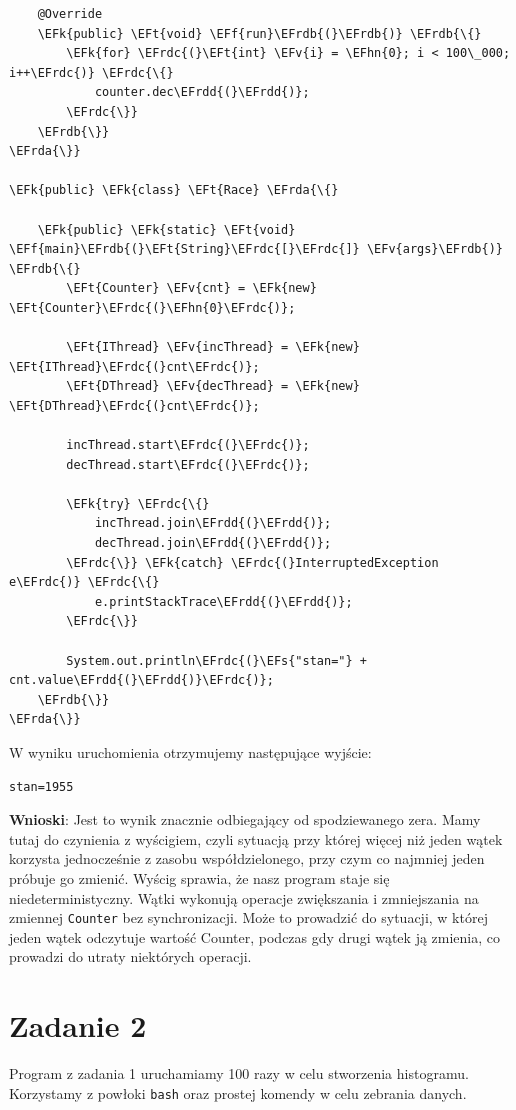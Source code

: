 \documentclass[11pt]{article}
\newcommand{\EFs}[1]{\textcolor{EFs}{#1}} %
\newcommand{\EFk}[1]{\textbf{#1}} %
\newcommand{\EFf}[1]{\textbf{#1}} %
\newcommand{\EFv}[1]{#1} %
\newcommand{\EFt}[1]{\textbf{#1}} %
\newcommand{\EFhn}[1]{\textcolor{EFhn}{\textbf{#1}}} %
\newcommand{\EFrda}[1]{\textcolor{EFrda}{#1}} %
\newcommand{\EFrdb}[1]{\textcolor{EFrdb}{#1}} %
\newcommand{\EFrdc}[1]{\textcolor{EFrdc}{#1}} %
\newcommand{\EFrdd}[1]{\textcolor{EFrdd}{#1}} %
\begin{document}
\begin{Code}
\begin{Verbatim}
    @Override
    \EFk{public} \EFt{void} \EFf{run}\EFrdb{(}\EFrdb{)} \EFrdb{\{}
        \EFk{for} \EFrdc{(}\EFt{int} \EFv{i} = \EFhn{0}; i < 100\_000; i++\EFrdc{)} \EFrdc{\{}
            counter.dec\EFrdd{(}\EFrdd{)};
        \EFrdc{\}}
    \EFrdb{\}}
\EFrda{\}}

\EFk{public} \EFk{class} \EFt{Race} \EFrda{\{}

    \EFk{public} \EFk{static} \EFt{void} \EFf{main}\EFrdb{(}\EFt{String}\EFrdc{[}\EFrdc{]} \EFv{args}\EFrdb{)} \EFrdb{\{}
        \EFt{Counter} \EFv{cnt} = \EFk{new} \EFt{Counter}\EFrdc{(}\EFhn{0}\EFrdc{)};

        \EFt{IThread} \EFv{incThread} = \EFk{new} \EFt{IThread}\EFrdc{(}cnt\EFrdc{)};
        \EFt{DThread} \EFv{decThread} = \EFk{new} \EFt{DThread}\EFrdc{(}cnt\EFrdc{)};

        incThread.start\EFrdc{(}\EFrdc{)};
        decThread.start\EFrdc{(}\EFrdc{)};

        \EFk{try} \EFrdc{\{}
            incThread.join\EFrdd{(}\EFrdd{)};
            decThread.join\EFrdd{(}\EFrdd{)};
        \EFrdc{\}} \EFk{catch} \EFrdc{(}InterruptedException e\EFrdc{)} \EFrdc{\{}
            e.printStackTrace\EFrdd{(}\EFrdd{)};
        \EFrdc{\}}

        System.out.println\EFrdc{(}\EFs{"stan="} + cnt.value\EFrdd{(}\EFrdd{)}\EFrdc{)};
    \EFrdb{\}}
\EFrda{\}}

\end{Verbatim}
\end{Code}

W wyniku uruchomienia otrzymujemy następujące wyjście:
\begin{tcolorbox}
\begin{Verbatim}
stan=1955
\end{Verbatim}


\end{tcolorbox}\textbf{Wnioski}: Jest to wynik znacznie odbiegający od spodziewanego zera.  Mamy tutaj do
czynienia z wyścigiem, czyli sytuacją przy której więcej niż jeden wątek
korzysta jednocześnie z zasobu współdzielonego, przy czym co najmniej jeden
próbuje go zmienić. Wyścig sprawia, że nasz program staje się
niedeterministyczny. Wątki wykonują operacje zwiększania i zmniejszania na
zmiennej \texttt{Counter} bez synchronizacji. Może to prowadzić do sytuacji, w której
jeden wątek odczytuje wartość Counter, podczas gdy drugi wątek ją zmienia, co
prowadzi do utraty niektórych operacji.
\section*{Zadanie 2}
\label{sec:org9a7dde0}
Program z zadania 1 uruchamiamy 100 razy w celu stworzenia histogramu.
Korzystamy z powłoki \texttt{bash} oraz prostej komendy w celu zebrania danych.
\end{document}

